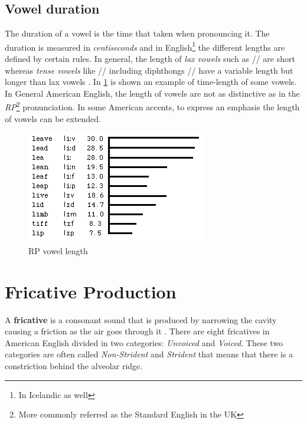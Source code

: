 \subsection{Vowel duration}
\label{sub:vowel_duration}
The duration of a vowel is the time that taken when pronouncing it. The duration is measured in \textit{centiseconds} and in English\footnote{In Icelandic as well} the different lengths are defined by certain rules. In general, the length of \textit{lax vowels} such as // are short whereas \textit{tense vowels} like // including diphthongs // have a variable length but longer than lax vowels \cite{vowel_length}. In \ref{fig:vowel_length} is shown an example of time-length of some vowels.
\noindent In General American English, the length of vowels are not as distinctive as in the \textit{RP}\footnote{More commonly referred as the Standard English in the UK} pronunciation. In some American accents, to express an emphasis the length of vowels can be extended.

\begin{figure}[!ht]
    \centering
    \includegraphics[scale=0.6]{Figures/vowel_length.png}
    \caption{RP vowel length \cite{vowel_length}}
    \label{fig:vowel_length}
\end{figure}


\section{Fricative Production}
\label{sec:fricative_production}
A \textbf{fricative} is a consonant sound that is produced by narrowing the cavity causing a friction as the air goes through it \cite{fricatives}. There are eight fricatives in American English divided in two categories: \textit{Unvoiced} and \textit{Voiced}. These two categories are often called \textit{Non-Strident} and \textit{Strident} that means that there is a constriction behind the alveolar ridge.


